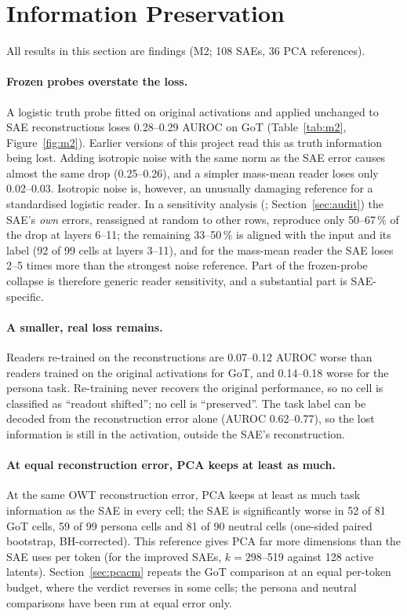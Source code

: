 \section{Information Preservation}\label{sec:info}

All results in this section are  findings (M2; 108 SAEs, 36 PCA references).

\paragraph{Frozen probes overstate the loss.} A logistic truth probe fitted on original activations and applied
unchanged to SAE reconstructions loses 0.28--0.29 AUROC on GoT (Table~\ref{tab:m2}, Figure~\ref{fig:m2}). Earlier
versions of this project read this as truth information being lost. Adding isotropic noise with the same norm as the
SAE error causes almost the same drop (0.25--0.26), and a simpler mass-mean reader loses only 0.02--0.03. Isotropic
noise is, however, an unusually damaging reference for a standardised logistic reader. In a sensitivity analysis
(; Section~\ref{sec:audit}) the SAE's \emph{own} errors, reassigned at random to other rows, reproduce
only 50--67\,\% of the drop at layers 6--11; the remaining 33--50\,\% is aligned with the input and its label (92 of 99
cells at layers 3--11), and for the mass-mean reader the SAE loses 2--5 times more than the strongest noise reference. Part of
the frozen-probe collapse is therefore generic reader sensitivity, and a substantial part is SAE-specific.

\paragraph{A smaller, real loss remains.} Readers re-trained on the reconstructions are 0.07--0.12 AUROC worse than
readers trained on the original activations for GoT, and 0.14--0.18 worse for the persona task. Re-training never
recovers the original performance, so no cell is classified as ``readout shifted''; no cell is ``preserved''. The
task label can be decoded from the reconstruction error alone (AUROC 0.62--0.77), so the lost information is still in
the activation, outside the SAE's reconstruction.

\paragraph{At equal reconstruction error, PCA keeps at least as much.} At the same OWT reconstruction error, PCA
keeps at least as much task information as the SAE in every cell; the SAE is significantly worse in 52 of 81 GoT
cells, 59 of 99 persona cells and 81 of 90 neutral cells (one-sided paired bootstrap, BH-corrected). This reference
gives PCA far more dimensions than the SAE uses per token (for the improved SAEs, $k=298$--519 against 128 active
latents). Section~\ref{sec:pcacm} repeats the GoT comparison at an equal per-token budget, where the verdict reverses
in some cells; the persona and neutral comparisons have been run at equal error only.

